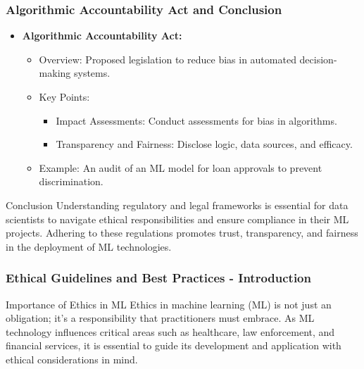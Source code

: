 \documentclass{beamer}
\begin{document}
\begin{frame}[fragile]
    \frametitle{Algorithmic Accountability Act and Conclusion}
    \begin{itemize}
        \item \textbf{Algorithmic Accountability Act:}
            \begin{itemize}
                \item Overview: Proposed legislation to reduce bias in automated decision-making systems.
                \item Key Points:
                    \begin{itemize}
                        \item Impact Assessments: Conduct assessments for bias in algorithms.
                        \item Transparency and Fairness: Disclose logic, data sources, and efficacy.
                    \end{itemize}
                \item Example: An audit of an ML model for loan approvals to prevent discrimination.
            \end{itemize}
    \end{itemize}

    \begin{block}{Conclusion}
        Understanding regulatory and legal frameworks is essential for data scientists to navigate ethical responsibilities and ensure compliance in their ML projects. 
        Adhering to these regulations promotes trust, transparency, and fairness in the deployment of ML technologies.
    \end{block}
\end{frame}

\begin{frame}[fragile]
    \frametitle{Ethical Guidelines and Best Practices - Introduction}
    \begin{block}{Importance of Ethics in ML}
        Ethics in machine learning (ML) is not just an obligation; it's a responsibility that practitioners must embrace. As ML technology influences critical areas such as healthcare, law enforcement, and financial services, it is essential to guide its development and application with ethical considerations in mind.
    \end{block}
\end{frame}
\end{document}
